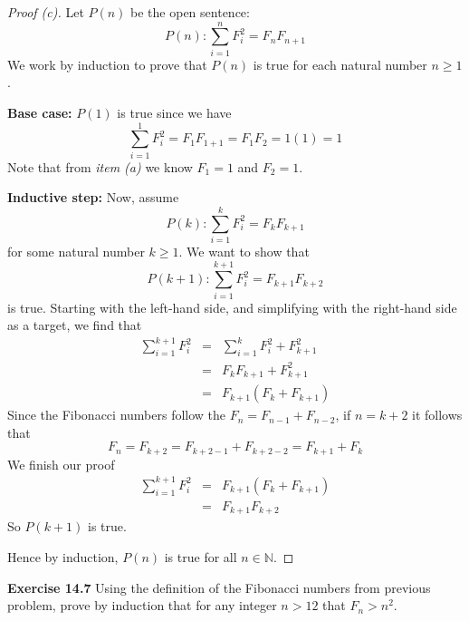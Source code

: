 \documentclass[12pt,oneside]{article}
\newenvironment{exercise}[1]{\vspace{.1in}\noindent\textbf{Exercise #1 \hspace{.05em}}}{}
\newcommand{\N}{\mathbb{N}}
\begin{document}
\begin{proof}[Proof (c)]
Let $P(n)$ be the open sentence:
\[P(n): \sum_{i=1}^{n}F_i^2 = F_nF_{n+1}\]
We work by induction to prove that $P(n)$ is true for each natural number $n \geq 1$.

\textbf{Base case:} $P(1)$ is true since we have
\[\sum_{i=1}^{1}F_i^2 = F_1F_{1+1} = F_1F_2 = 1(1) = 1\]
Note that from \textit{item (a)} we know $F_1 = 1$ and $F_2 = 1$.

\textbf{Inductive step:} Now, assume
\[P(k): \sum_{i=1}^{k}F_i^2 = F_kF_{k+1}\]
for some natural number $k \geq 1$. We want to show that
\[P(k+1): \sum_{i=1}^{k+1}F_i^2 = F_{k+1}F_{k+2}\]
is true. Starting with the left-hand side, and simplifying with the right-hand side as a target, we find that
\begin{eqnarray*}
\sum_{i=1}^{k+1}F_i^2  &=& \sum_{i=1}^{k}F_i^2 + F_{k+1}^2 \\
&=& F_kF_{k+1} + F_{k+1}^2 \\
&=& F_{k+1}(F_k + F_{k+1})
\end{eqnarray*}
Since the Fibonacci numbers follow the $F_n = F_{n-1} + F_{n-2}$, if $n = k+2$ it follows that
\[F_n = F_{k+2} = F_{k+2-1} + F_{k+2-2} = F_{k+1} + F_k\]
We finish our proof
\begin{eqnarray*}
\sum_{i=1}^{k+1}F_i^2 &=& F_{k+1}(F_k + F_{k+1}) \\
&=& F_{k+1}F_{k+2}
\end{eqnarray*}
So $P(k+1)$ is true.

Hence by induction, $P(n)$ is true for all $n \in \N$.
\end{proof}


\begin{exercise}{14.7}
Using the definition of the Fibonacci numbers from previous problem, prove by induction that for any integer $n>12$ that $F_n > n^2$.
\end{exercise}
\end{document}
